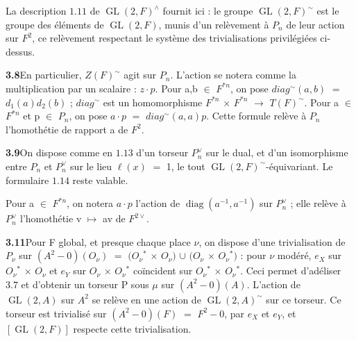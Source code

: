 \documentclass[10pt,a4paper]{article}
\begin{document}
\par La description $1.11$ de $\operatorname{GL}(2,F)^\wedge{}$ fournit ici : le groupe $\operatorname{GL}(2,F)^\sim$ est le groupe des éléments de $\operatorname{GL}(2,F)$, munis d'un relèvement à $P_n$ de leur action sur $F^2$, ce relèvement respectant le système des trivialisations privilégiées ci-dessus.\par
\par\noindent\textbf{3.8}\quad En particulier, $Z(F)^\sim$ agit sur $P_n$. L'action se notera comme la multiplication par un scalaire : $z\cdot{}p$. Pour a,b $\in{}$ $F^{*n}$, on pose $diag^\sim(a,b)$ $=$ $d_1(a)d_2(b)$ ; $diag^\sim$ est un homomorphisme $F^{*n}$ $\times{}$ $F^{*n}$ $\to{}$ $T(F)^\sim$. Pour a $\in{}$ $F^{*n}$ et p $\in{}$ $P_n$, on pose $a\cdot{}p$ $=$ $diag^\sim(a,a)p$. Cette formule relève à $P_n$ l'homothétie de rapport a de $F^2$.\par
\par\noindent\textbf{3.9}\quad On dispose comme en $1.13$ d'un torseur $P_n^\vee{}$ sur le dual, et d'un isomorphisme entre $P_n$ et $P_n^\vee{}$ sur le lieu $\ell{}(x)$ $=$ 1, le tout $\operatorname{GL}(2,F)^\sim$-équivariant. Le formulaire $1.14$ reste valable.\par
\par Pour a $\in{}$ $F^{*n}$, on notera $a\cdot{}p$ l'action de $\operatorname{diag}(a^{-1},a^{-1})$ sur $P_n^\vee{}$ ; elle relève à $P_n^\vee{}$ l'homothétie v $\mapsto{}$ av de $F^{2\vee{}}$.\par
\par\medskip{}\par\smallskip

\clearpage
{}
\label{d035-physical-018}
\par\noindent\textbf{3.11}\quad Pour F global, et presque chaque place $\nu{}$, on dispose d'une trivialisation de $P_\nu{}$ sur $(A^2-{0})(O_\nu{})$ $=$ $(O_\nu{}^*$ $\times{}$ $O_\nu{})$ $\cup{}$ $(O_\nu{}$ $\times{}$ $O_\nu{}^*)$ : pour $\nu{}$ modéré, $e_X$ sur $O_\nu{}^*$ $\times{}$ $O_\nu{}$ et $e_Y$ sur $O_\nu{}$ $\times{}$ $O_\nu{}^*$ coïncident sur $O_\nu{}^*$ $\times{}$ $O_\nu{}^*$. Ceci permet d'adéliser $3.7$ et d'obtenir un torseur P sous $\mu{}$ sur $(A^2-{0})(A)$. L'action de $\operatorname{GL}(2,A)$ sur $A^2$ se relève en une action de $\operatorname{GL}(2,A)^\sim$ sur ce torseur. Ce torseur est trivialisé sur $(A^2-{0})(F)$ $=$ $F^2-{0}$, par $e_X$ et $e_Y$, et $[\operatorname{GL}(2,F)]$ respecte cette trivialisation.\par
\end{document}
